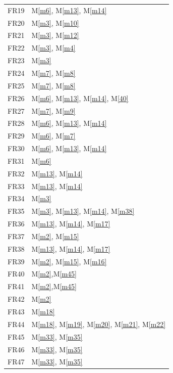 \documentclass[12pt, titlepage]{article}
\newcommand{\mref}[1]{M\ref{#1}}
\begin{document}
\begin{longtable}{p{} p{}}
			FR19 & \mref{m6}, \mref{m13}, \mref{m14} \\
			FR20 & \mref{m3}, \mref{m10} \\
			FR21 & \mref{m3}, \mref{m12} \\
			FR22 & \mref{m3}, \mref{m4} \\
			FR23 & \mref{m3} \\
			\hline 
			\newpage
			\hline
			FR24 & \mref{m7}, \mref{m8} \\
			FR25 & \mref{m7}, \mref{m8} \\
			FR26 & \mref{m6}, \mref{m13}, \mref{m14}, \mref{40}\\
			FR27 & \mref{m7}, \mref{m9}\\
			FR28 & \mref{m6}, \mref{m13}, \mref{m14}\\
			FR29 & \mref{m6}, \mref{m7}\\
			FR30 & \mref{m6}, \mref{m13}, \mref{m14}\\
			FR31 & \mref{m6} \\
			FR32 & \mref{m13}, \mref{m14}\\
			FR33 & \mref{m13}, \mref{m14}\\
			FR34 & \mref{m3}\\
			FR35 & \mref{m3}, \mref{m13}, \mref{m14}, \mref{m38} \\
			FR36 & \mref{m13}, \mref{m14}, \mref{m17} \\
			FR37 & \mref{m2}, \mref{m15} \\
			FR38 & \mref{m13}, \mref{m14},  \mref{m17} \\
			FR39 & \mref{m2}, \mref{m15}, \mref{m16} \\
			FR40 & \mref{m2},\mref{m45} \\
			FR41 & \mref{m2},\mref{m45} \\
			FR42 & \mref{m2} \\
			FR43 & \mref{m18} \\
			FR44 & \mref{m18}, \mref{m19}, \mref{m20}, \mref{m21}, \mref{m22} \\
			FR45 & \mref{m33}, \mref{m35} \\
			FR46 & \mref{m33}, \mref{m35} \\
			FR47 & \mref{m33}, \mref{m35} \\
			\bottomrule
		\end{longtable}
	\newpage
	
\end{document}
